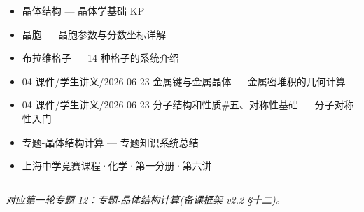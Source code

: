\begin{itemize}
\tightlist
\item
  晶体结构 --- 晶体学基础 KP
\item
  晶胞 --- 晶胞参数与分数坐标详解
\item
  布拉维格子 --- 14 种格子的系统介绍
\item
  04-课件/学生讲义/2026-06-23-金属键与金属晶体 --- 金属密堆积的几何计算
\item
  04-课件/学生讲义/2026-06-23-分子结构和性质\#五、对称性基础 --- 分子对称性入门
\item
  专题-晶体结构计算 --- 专题知识系统总结
\item
  上海中学竞赛课程·化学·第一分册·第六讲
\end{itemize}

\begin{center}\rule{0.5\linewidth}{0.5pt}\end{center}

\emph{对应第一轮专题 12：专题-晶体结构计算(备课框架 v2.2 §十二)。}
